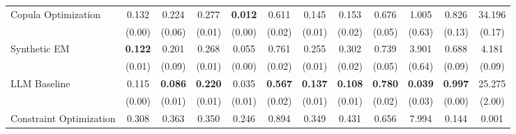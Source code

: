 \begin{table}[ht]
{\begin{tabular}{l cccc cccc cc c}
            \addlinespace[0.2em]
            Copula Optimization     & 0.132                                           & 0.224                                        & 0.277                                         & \textbf{0.012}          & 0.611             & 0.145           & 0.153           & 0.676             & 1.005            & 0.826            & 34.196              \\
                                    & (0.00)                                          & (0.06)                                       & (0.01)                                        & (0.00)                  & (0.02)            & (0.01)          & (0.02)          & (0.05)            & (0.63)           & (0.13)           & (0.17)              \\
            \addlinespace[0.2em]
            Synthetic EM            & \textbf{0.122}                                  & 0.201                                        & 0.268                                         & 0.055                   & 0.761             & 0.255           & 0.302           & 0.739             & 3.901            & 0.688            & 4.181               \\
                                    & (0.01)                                          & (0.09)                                       & (0.01)                                        & (0.00)                  & (0.02)            & (0.01)          & (0.02)          & (0.05)            & (0.64)           & (0.09)           & (0.09)              \\
            \addlinespace[0.2em]
            LLM Baseline            & 0.115                                           & \textbf{0.086}                               & \textbf{0.220}                                & 0.035                   & \textbf{0.567   } & \textbf{0.137 } & \textbf{0.108 } & \textbf{0.780   } & \textbf{0.039  } & \textbf{ 0.997 } & 25.275              \\
                                    & (0.00)                                          & (0.01)                                       & (0.01)                                        & (0.01)                  & (0.02)            & (0.01)          & (0.01)          & (0.02)            & (0.03)           & (0.00)           & (2.00)              \\
            \addlinespace[0.2em]
            Constraint Optimization & 0.308                                           & 0.363                                        & 0.350                                         & 0.246                   & 0.894             & 0.349           & 0.431           & 0.656             & 7.994            & 0.144            & 0.001               \\

\end{tabular}}
\end{table}
